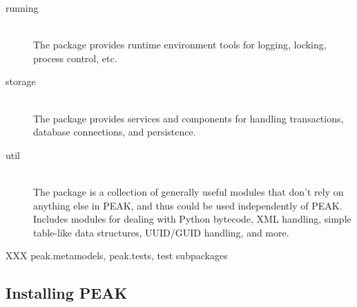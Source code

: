 \begin{description}
\item[running] \hfill \\ 
The  package provides runtime environment tools for
logging, locking, process control, etc.

\item[storage] \hfill \\ 
The  package provides services and components for
handling transactions, database connections, and persistence.

\item[util] \hfill \\ 
The  package is a collection of generally useful modules
that don't rely on anything else in PEAK, and thus could be used
independently of PEAK.  Includes modules for dealing with Python bytecode,
XML handling, simple table-like data structures, UUID/GUID handling, and more.

\end{description}

XXX peak.metamodels, peak.tests, test subpackages


\subsection{Installing PEAK}














